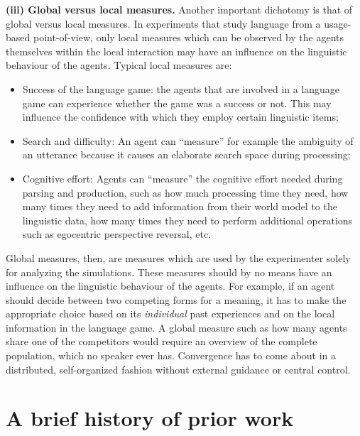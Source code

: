 {\bfseries (iii) Global versus local measures.}
Another important dichotomy is that of global versus local measures. In experiments that study language from a usage-based point-of-view, only local measures which can be observed by the agents themselves within the local interaction may have an influence on the linguistic behaviour of the agents. Typical local measures are:

\begin{itemize}
\item Success of the language game: the agents that are involved in a language game can experience whether the game was a success or not. This may influence the confidence with which they employ certain linguistic items;
\item Search and difficulty: An agent can ``measure'' for example the ambiguity of an utterance because it causes an elaborate search space during processing;
\item Cognitive effort: Agents can ``measure'' the cognitive effort needed during parsing and production, such as how much processing time they need, how many times they need to add information from their world model to the linguistic data, how many times they need to perform additional operations such as egocentric perspective reversal, etc.
\end{itemize}

Global measures, then, are measures which are used by the experimenter solely for analyzing the simulations. These measures should by no means have an influence on the linguistic behaviour of the agents. For example, if an agent should decide between two competing forms for a meaning, it has to make the appropriate choice based on its {\em individual} past experiences and on the local information in the language game. A global measure such as how many agents share one of the competitors would require an overview of the complete population, which no speaker ever has. Convergence has to come about in a distributed, self-organized fashion without external guidance or central control.

\section{A brief history of prior work}
\label{s:history-of-research}

